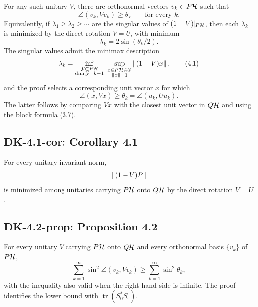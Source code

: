 For any such unitary $V$, there are orthonormal vectors $v_k\in P\mathcal{H}$ such that
\[
 \angle(v_k,Vv_k)\ge\theta_k\qquad\text{for every }k.
\]
Equivalently, if $\lambda_1\ge\lambda_2\ge\cdots$ are the singular values of $(1-V)|_{P\mathcal{H}}$, then each $\lambda_k$ is minimized by the direct rotation $V=U$, with minimum
\[
 \lambda_k=2\sin(\theta_k/2).
\]
The singular values admit the minimax description
\begin{equation}
 \lambda_k
 =\inf_{\substack{\mathcal Y\subset P\mathcal{H}\\\dim\mathcal Y=k-1}}
   \ \sup_{\substack{x\in P\mathcal{H}\ominus\mathcal Y\\\left\lVert x\right\rVert=1}}
   \left\lVert (1-V)x\right\rVert,
 \tag{4.1}
\end{equation}
and the proof selects a corresponding unit vector $x$ for which
\begin{equation}
 \angle(x,Vx)\ge\theta_k=\angle(u_k,Uu_k).
 \tag{4.2}
\end{equation}
The latter follows by comparing $Vx$ with the closest unit vector in $Q\mathcal{H}$ and using the block formula (3.7).

\subsection*{DK-4.1-cor: Corollary 4.1}
For every unitary-invariant norm,
\[
 \left\lVert (1-V)P\right\rVert
\]
is minimized among unitaries carrying $P\mathcal{H}$ onto $Q\mathcal{H}$ by the direct rotation $V=U$.

\subsection*{DK-4.2-prop: Proposition 4.2}
For every unitary $V$ carrying $P\mathcal{H}$ onto $Q\mathcal{H}$ and every orthonormal basis $\{v_k\}$ of $P\mathcal{H}$,
\[
 \sum_{k=1}^{\infty}\sin^2\angle(v_k,Vv_k)
 \ge
 \sum_{k=1}^{\infty}\sin^2\theta_k,
\]
with the inequality also valid when the right-hand side is infinite.  The proof identifies the lower bound with $\operatorname{tr}(S_0^*S_0)$.

